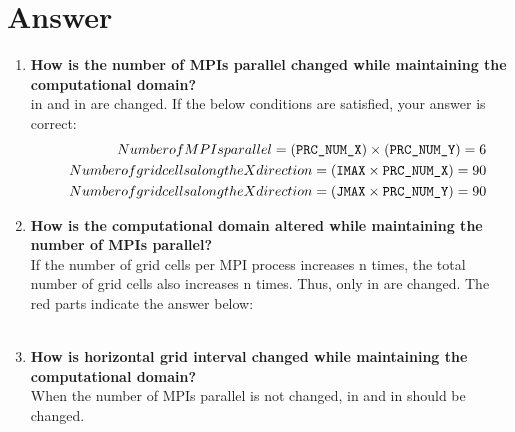 
\clearpage
\section*{Answer}
\begin{enumerate}
\item {\bf How is the number of MPIs parallel changed while maintaining the computational domain?}\\
 in  and  in  
are changed. If the below conditions are satisfied, your answer is correct:
\begin{eqnarray}
&& Number of MPIs parallel = (\verb|PRC_NUM_X|) \times (\verb|PRC_NUM_Y|) = 6 \nonumber\\
&& Number of grid cells along the X direction = \left(\verb|IMAX| \times \verb|PRC_NUM_X|\right) = 90 \nonumber\\
&& Number of grid cells along the X direction = \left(\verb|JMAX| \times \verb|PRC_NUM_Y|\right) = 90 \nonumber
\end{eqnarray}


\item {\bf How is the computational domain altered while maintaining the number of MPIs parallel?}\\
If the number of grid cells per MPI process increases n times, the total number of grid cells also increases n times. Thus, only  in  are changed. The red parts indicate the answer below:\\
\\

\item {\bf How is horizontal grid interval changed while maintaining the computational domain?}\\
When the number of MPIs parallel is not changed,  in  and   in  should be changed.


\end{enumerate}
